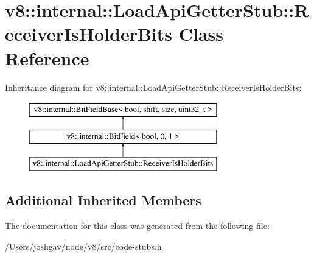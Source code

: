 \hypertarget{classv8_1_1internal_1_1_load_api_getter_stub_1_1_receiver_is_holder_bits}{}\section{v8\+:\+:internal\+:\+:Load\+Api\+Getter\+Stub\+:\+:Receiver\+Is\+Holder\+Bits Class Reference}
\label{classv8_1_1internal_1_1_load_api_getter_stub_1_1_receiver_is_holder_bits}
Inheritance diagram for v8\+:\+:internal\+:\+:Load\+Api\+Getter\+Stub\+:\+:Receiver\+Is\+Holder\+Bits\+:\begin{figure}[H]
\begin{center}
\leavevmode
\includegraphics[height=3.000000cm]{classv8_1_1internal_1_1_load_api_getter_stub_1_1_receiver_is_holder_bits}
\end{center}
\end{figure}
\subsection*{Additional Inherited Members}


The documentation for this class was generated from the following file\+:\begin{DoxyCompactItemize}
\item 
/\+Users/joshgav/node/v8/src/code-\/stubs.\+h\end{DoxyCompactItemize}
